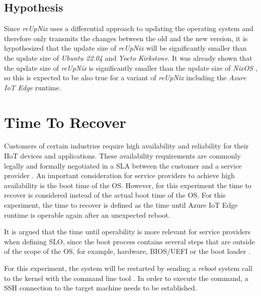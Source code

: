 \subsection{Hypothesis}

Since \textit{reUpNix} uses a differential approach to updating the operating
system and therefore only transmits the changes between the old and the new
version, it is hypothesized that the update size of \textit{reUpNix} will be
significantly smaller than the update size of \textit{Ubuntu 22.04} and
\textit{Yocto Kirkstone}. It was already shown that the update size of
\textit{reUpNix} is significantly smaller than the update size of \textit{NixOS}
\cite{gollenstede:23:lctes}, so this is expected to be also true for a variant
of \textit{reUpNix} including the \textit{Azure IoT Edge} runtime.

\section{Time To Recover}
\label{sec:time-to-recover}
Customers of certain industries require high availability and reliability for
their \ac{IIoT} devices and applications. These availability requirements
are commonly legally and formally negotiated in a \ac{SLA} between
the customer and a service provider \cite{msdoc-slas}. An important consideration
for service providers to achieve high availability is the boot time of the
\ac{OS}. However, for this experiment the time to recover is considered
instead of the actual boot time of the \ac{OS}. For this experiment, the time to recover 
is defined as the time until Azure IoT Edge runtime is operable again after
an unexpected reboot.

It is argued that the time until operability is more relevant for service providers
when defining \ac{SLO}, since the boot process contains several steps that are
outside of the scope of the \ac{OS}, for example, hardware, BIOS/UEFI or the boot
loader \cite{almesberg}.

For this experiment, the system will be restarted by sending a \textit{reboot} system
call to the kernel with the  command line tool \cite{man-reboot}.
In order to execute the command, a \ac{SSH} connection to the target machine
needs to be established.

\clearpage

